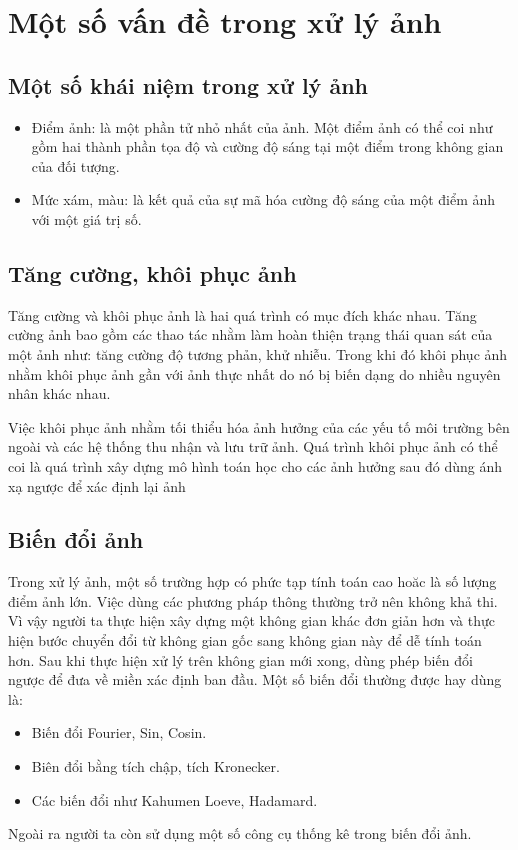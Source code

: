 \documentclass[12pt, oneside, a4paper]{book}
\begin{document}
\section{Một số vấn đề trong xử lý ảnh}
\subsection{Một số khái niệm trong xử lý ảnh}
\begin{itemize}
\item Điểm ảnh: là một phần tử nhỏ nhất của ảnh. Một điểm ảnh có thể coi như gồm hai thành phần tọa độ và cường độ sáng tại một điểm trong không gian của đối tượng. 
\item Mức xám, màu: là kết quả của sự mã hóa cường độ sáng của một điểm ảnh với một giá trị số.
\end{itemize}
\subsection{Tăng cường, khôi phục ảnh}
Tăng cường và khôi phục ảnh là hai quá trình có mục đích khác nhau. Tăng cường ảnh bao gồm các thao tác nhằm làm hoàn thiện trạng thái quan sát của một ảnh như: tăng cường độ tương phản, khử nhiễu. Trong khi đó khôi phục ảnh nhằm khôi phục ảnh  gần với ảnh thực nhất do nó bị biến dạng do nhiều nguyên nhân khác nhau.

Việc khôi phục ảnh nhằm tối thiểu hóa ảnh hưởng của các yếu tố môi trường bên ngoài và các hệ thống thu nhận và lưu trữ ảnh. Quá trình khôi phục ảnh có thể coi là quá trình xây dựng mô hình toán học cho các ảnh hưởng sau đó dùng ánh xạ ngược để xác định lại ảnh 
\subsection{Biến đổi ảnh}
Trong xử lý ảnh, một số trường hợp có phức tạp tính toán cao hoăc là số lượng điểm ảnh lớn. Việc dùng các phương pháp thông thường trở nên không khả thi. Vì vậy người ta thực hiện xây dựng một không gian khác đơn giản hơn và thực hiện bước chuyển đổi từ không gian gốc sang không gian này để dễ tính toán hơn. Sau khi thực hiện xử lý trên không gian mới xong, dùng phép biến đổi ngược để đưa về miền xác định ban đầu. Một số biến đổi thường được hay dùng là:
\begin{itemize}
\item Biến đổi Fourier, Sin,  Cosin.
\item Biên đổi bằng tích chập, tích Kronecker.
\item Các biến đổi như Kahumen Loeve, Hadamard.
\end{itemize}
Ngoài ra người ta còn sử dụng một số công cụ thống kê trong biến đổi ảnh.
\end{document}
